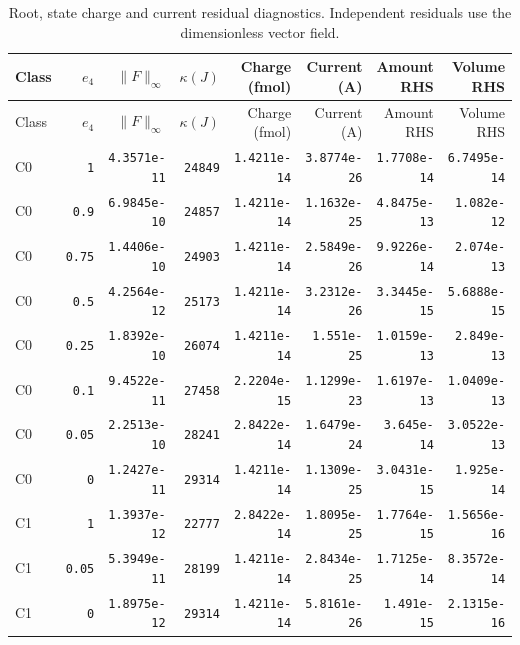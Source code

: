 \endgroup


\begingroup\scriptsize
\setlength{\tabcolsep}{3pt}
\begin{longtable}{lrrrrrrr}
\caption{Root, state charge and current residual diagnostics. Independent residuals use the dimensionless vector field.}\\
\toprule
Class & $e_4$ & $\|F\|_\infty$ & $\kappa(J)$ & Charge (fmol) & Current (A) & Amount RHS & Volume RHS \\
\midrule\endfirsthead
\toprule
Class & $e_4$ & $\|F\|_\infty$ & $\kappa(J)$ & Charge (fmol) & Current (A) & Amount RHS & Volume RHS \\
\midrule\endhead
\bottomrule\endfoot
C0 & \texttt{1} & \texttt{4.3571e-11} & \texttt{24849} & \texttt{1.4211e-14} & \texttt{3.8774e-26} & \texttt{1.7708e-14} & \texttt{6.7495e-14} \\
C0 & \texttt{0.9} & \texttt{6.9845e-10} & \texttt{24857} & \texttt{1.4211e-14} & \texttt{1.1632e-25} & \texttt{4.8475e-13} & \texttt{1.082e-12} \\
C0 & \texttt{0.75} & \texttt{1.4406e-10} & \texttt{24903} & \texttt{1.4211e-14} & \texttt{2.5849e-26} & \texttt{9.9226e-14} & \texttt{2.074e-13} \\
C0 & \texttt{0.5} & \texttt{4.2564e-12} & \texttt{25173} & \texttt{1.4211e-14} & \texttt{3.2312e-26} & \texttt{3.3445e-15} & \texttt{5.6888e-15} \\
C0 & \texttt{0.25} & \texttt{1.8392e-10} & \texttt{26074} & \texttt{1.4211e-14} & \texttt{1.551e-25} & \texttt{1.0159e-13} & \texttt{2.849e-13} \\
C0 & \texttt{0.1} & \texttt{9.4522e-11} & \texttt{27458} & \texttt{2.2204e-15} & \texttt{1.1299e-23} & \texttt{1.6197e-13} & \texttt{1.0409e-13} \\
C0 & \texttt{0.05} & \texttt{2.2513e-10} & \texttt{28241} & \texttt{2.8422e-14} & \texttt{1.6479e-24} & \texttt{3.645e-14} & \texttt{3.0522e-13} \\
C0 & \texttt{0} & \texttt{1.2427e-11} & \texttt{29314} & \texttt{1.4211e-14} & \texttt{1.1309e-25} & \texttt{3.0431e-15} & \texttt{1.925e-14} \\
C1 & \texttt{1} & \texttt{1.3937e-12} & \texttt{22777} & \texttt{2.8422e-14} & \texttt{1.8095e-25} & \texttt{1.7764e-15} & \texttt{1.5656e-16} \\
C1 & \texttt{0.05} & \texttt{5.3949e-11} & \texttt{28199} & \texttt{1.4211e-14} & \texttt{2.8434e-25} & \texttt{1.7125e-14} & \texttt{8.3572e-14} \\
C1 & \texttt{0} & \texttt{1.8975e-12} & \texttt{29314} & \texttt{1.4211e-14} & \texttt{5.8161e-26} & \texttt{1.491e-15} & \texttt{2.1315e-16} \\

\end{longtable}
